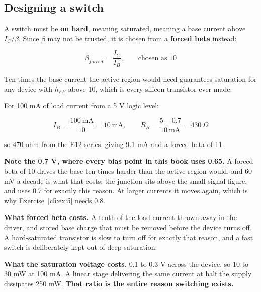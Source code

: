 \subsection{Designing a switch}
\label{c5:sec:a4}
A switch must be \textbf{on hard}, meaning saturated, meaning a base current above $I_C/\beta$. Since $\beta$ may not be trusted, it is chosen from a \textbf{forced beta} instead:

\[
  \beta_{forced} = \frac{I_C}{I_B}, \qquad \text{chosen as 10}
\]

Ten times the base current the active region would need guarantees saturation for any device with $h_{FE}$ above 10, which is every silicon transistor ever made.


For 100 mA of load current from a 5 V logic level:

\[
  I_B = \frac{100\ \text{mA}}{10} = 10\ \text{mA}, \qquad
  R_B = \frac{5 - 0.7}{10\ \text{mA}} = 430\ \Omega
\]

so 470 ohm from the E12 series, giving 9.1 mA and a forced beta of 11.

\textbf{Note the 0.7 V, where every bias point in this book uses 0.65.} A forced beta of 10 drives the base ten times harder than the active region would, and 60 mV a decade is what that costs: the junction sits above the small-signal figure, and  uses 0.7 for exactly this reason. At larger currents it moves again, which is why Exercise~\ref{c5:ex:5} needs 0.8.

\textbf{What forced beta costs.} A tenth of the load current thrown away in the driver, and stored base charge that must be removed before the device turns off. A hard-saturated transistor is slow to turn off for exactly that reason, and a fast switch is deliberately kept out of deep saturation.

\textbf{What the saturation voltage costs.} 0.1 to 0.3 V across the device, so 10 to 30 mW at 100 mA. A linear stage delivering the same current at half the supply dissipates 250 mW. \textbf{That ratio is the entire reason switching exists.}

